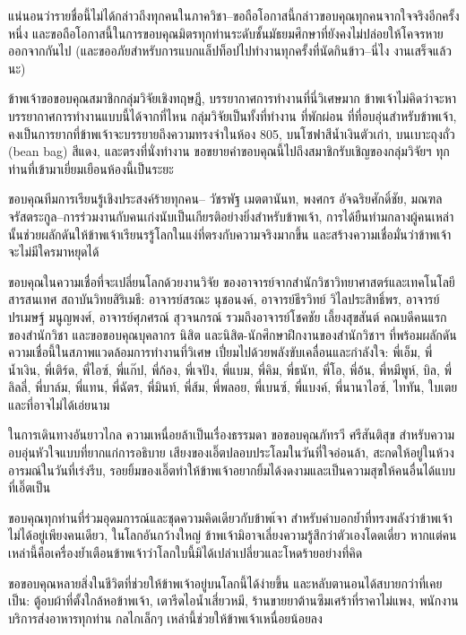 แน่นอนว่ารายชื่อนี้ไม่ได้กล่าวถึงทุกคนในภาควิชา--ขอถือโอกาสนี้กล่าวขอบคุณทุกคนจากใจจริงอีกครั้งหนึ่ง และขอถือโอกาสนี้ในการขอบคุณมิตรทุกท่านระดับชั้นมัธยมศึกษาที่ยังคงไม่ปล่อยให้โคจรหายออกจากกันไป (และขออภัยสำหรับการแบกแล็ปท็อปไปทำงานทุกครั้งที่นัดกินข้าว--นี่ไง งานเสร็จแล้วนะ)

ข้าพเจ้าขอขอบคุณสมาชิกกลุ่มวิจัยเชิงทฤษฎี, บรรยากาศการทำงานที่นี่วิเศษมาก ข้าพเจ้าไม่คิดว่าจะหาบรรยากาศการทำงานแบบนี้ได้จากที่ไหน กลุ่มวิจัยเป็นทั้งที่ทำงาน ที่พักผ่อน ที่ที่อบอุ่นสำหรับข้าพเจ้า, คงเป็นการยากที่ข้าพเจ้าจะบรรยายถึงความทรงจำในห้อง 805, บนโซฟาสีน้ำเงินตัวเก่า, บนเบาะถุงถั่ว (bean bag) สีแดง, และตรงที่นั่งทำงาน ขอขยายคำขอบคุณนี้ไปถึงสมาชิกรับเชิญของกลุ่มวิจัยฯ ทุกท่านที่เข้ามาเยี่ยมเยือนห้องนี้เป็นระยะ

ขอบคุณทีมการเรียนรู้เชิงประสงค์ร้ายทุกคน--
วัชรพัฐ เมตตานันท, พงศกร อัจฉริยศักดิ์ชัย, มณฑล จรัสตระกูล--การร่วมงานกับคนเก่งนับเป็นเกียรติอย่างยิ่งสำหรับข้าพเจ้า, การได้ยืนท่ามกลางผู้คนเหล่านั้นช่วยผลักดันให้ข้าพเจ้าเรียนรรู้โลกในแง่ที่ตรงกับความจริงมากขึ้น และสร้างความเชื่อมั่นว่าข้าพเจ้าจะไม่มีใครมาหยุดได้

ขอบคุณในความเชื่อที่จะเปลี่ยนโลกด้วยงานวิจัย ของอาจารย์จากสำนักวิชาวิทยาศาสตร์และเทคโนโลยีสารสนเทศ สถาบันวิทยสิริเมธี: อาจารย์สรณะ นุชอนงค์, อาจารย์ธีรวิทย์ วิไลประสิทธิ์พร, อาจารย์ปรเมษฐ์ มนูญพงศ์, อาจารย์ศุภศรณ์ สุวจนกรณ์ รวมถึงอาจารย์โชคชัย เลี้ยงสุขสันต์ คณบดีคนแรกของสำนักวิชา และขอขอบคุณบุคลากร นิสิต และนิสิต-นักศึกษาฝึกงานของสำนักวิชาฯ ที่พร้อมผลักดันความเชื่อนี้ในสภาพแวดล้อมการทำงานที่วิเศษ เปี่ยมไปด้วยพลังขับเคลื่อนและกำลังใจ: พี่เอ็ม, พี่น้ำเงิน, พี่เติร์ด, พี่ไอซ์, พี่แก๊ป, พี่ก้อง, พี่เจปัง, พี่แบม, พี่คิม, พี่ธนัท, พี่โอ, พี่อ้น, พี่หมีพูห์, บิล, พี่ลิลลี่, พี่บาล์ม, พี่แทน, พี่ฉัตร, พี่มินท์, พี่ส้ม, พี่พลอย, พี่เบนซ์, พี่แบงค์, พี่นานาไอซ์, ไททัน, ใบเตย และที่อาจไม่ได้เอ่ยนาม

ในการเดินทางอันยาวไกล ความเหนื่อยล้าเป็นเรื่องธรรมดา ขอขอบคุณภัทรวี ศรีสันติสุข สำหรับความอบอุ่นหัวใจแบบที่ยากแก่การอธิบาย เสียงของเอิ๊ตปลอบประโลมในวันที่ใจอ่อนล้า, สะกดให้อยู่ในห้วงอารมณ์ในวันที่เร่งรีบ, รอยยิ้มของเอิ๊ตทำให้ข้าพเจ้าอยากยิ้มได้งดงามและเป็นความสุขให้คนอื่นได้แบบที่เอิ๊ตเป็น

ขอบคุณทุกท่านที่ร่วมอุดมการณ์และชุดความคิดเดียวกับข้าพเ้จา สำหรับคำบอกย้ำที่ทรงพลังว่าข้าพเจ้าไม่ได้อยู่เพียงคนเดียว, ในโลกอันกว้างใหญ่ ข้าพเจ้ามิอาจเลี่ยงความรู้สึกว่าตัวเองโดดเดี่ยว หากแต่คนเหล่านี้คือเครื่องย้ำเตือนข้าพเจ้าว่าโลกใบนี้มิได้เปล่าเปลี่ยวและโหดร้ายอย่างที่คิด

ขอขอบคุณหลายสิ่งในชีวิตที่ช่วยให้ข้าพเจ้าอยู่บนโลกนี้ได้ง่ายขึ้น และหลับตานอนได้สบายกว่าที่เคยเป็น: ตู้อบผ้าที่ตั้งใกล้หอข้าพเจ้า, เตารีดไอน้ำเสี่ยวหมี, ร้านขายยาต้านซึมเศร้าที่ราคาไม่แพง, พนักงานบริการส่งอาหารทุกท่าน กลไกเล็กๆ เหล่านี้ช่วยให้ข้าพเจ้าเหนื่อยน้อยลง

